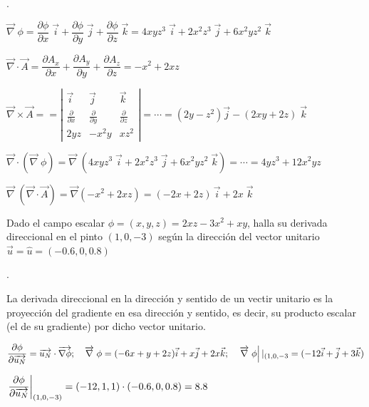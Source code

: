 \vspace{3mm}\begin{proofw}\renewcommand{\qedsymbol}{$\diamond$}.

$\overrightarrow \nabla \; \phi= \dfrac {\partial \phi}{\partial x}\; \vec i + \dfrac {\partial \phi}{\partial y}\; \vec j + \dfrac {\partial \phi}{\partial z}\; \vec k = 4xyz^3\; \vec i + 2x^2z^3\; \vec j + 6x^2yz^2\; \vec k$

$\overrightarrow \nabla \cdot \overrightarrow A=\dfrac {\partial A_x}{\partial x } + \dfrac {\partial A_y}{\partial y }+ \dfrac {\partial A_z}{\partial z }= -x^2+2xz$

$\overrightarrow \nabla \times \overrightarrow A== \left|
\begin{matrix}
\vec i & \vec j	& \vec k \\
\frac {\partial}{\partial x} & \frac {\partial}{\partial y} & \frac {\partial}{\partial z} \\
2yz & -x^2y & xz^2
\end{matrix}  \right|=\cdots =(2y-z^2) \vec j - (2xy+2z)\; \vec k$

$\overrightarrow \nabla \cdot (\overrightarrow \nabla \; \phi)= \overrightarrow \nabla \; ( 4xyz^3\; \vec i + 2x^2z^3\; \vec j + 6x^2yz^2\; \vec k)= \cdots = 4yz^3+12x^2yz$

$\overrightarrow \nabla \; (\overrightarrow \nabla \cdot \overrightarrow A)  =\overrightarrow \nabla (-x^2+2xz)=(-2x+2z)\, \vec i + 2x \; \vec k$

\end{proofw}

\vspace{3mm}\begin{ejre}
Dado el campo escalar $\phi=(x,y,z)=2xz-3x^2+xy$, halla su derivada direccional en el pinto $(1,0,-3)$ según la dirección del vector unitario $\vec u = \widehat { u } =(-0.6,0,0.8)$ 
\end{ejre}

\vspace{3mm}\begin{proofw}\renewcommand{\qedsymbol}{$\diamond$}.

La derivada direccional en la dirección y sentido de un vectir unitario es la proyección del gradiente en esa dirección y sentido, es decir, su producto escalar (el de su gradiente) por dicho vector unitario.

$\dfrac {\partial \phi}{\partial \overrightarrow {u_N}} = \overrightarrow {u_N} \cdot \overrightarrow {\nabla \phi}; \quad \overrightarrow \nabla \; \phi = (-6x+y+2z) \vec i + x \vec j + 2x \vec k; \quad \eval {\overrightarrow \nabla \; \phi}|_{(1,0,-3}=(-12\vec i + \vec j + 3\vec k)$

$\eval {\dfrac { \partial \phi }{ \partial \overrightarrow {u_N} } }_{(1,0,-3)} = (-12,1,1)\cdot(-0.6,0,0.8)=8.8$
	
\end{proofw}


